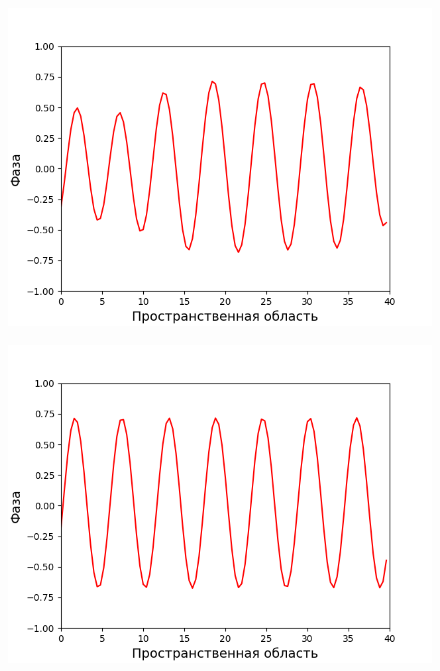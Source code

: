 \begin{figure}[p]
    \begin{minipage}{0.49\linewidth}
        \includegraphics[width=\linewidth]{images/3-data_data_100000.bin.png}
        \label{fig:modeling_1_d:3}
    \end{minipage}
    \hfill
    \begin{minipage}{0.49\linewidth}
        \includegraphics[width=\linewidth]{images/3-data_data_1000000.bin.png}
        \label{fig:modeling_1_d:4}
    \end{minipage}
    

\end{figure}

